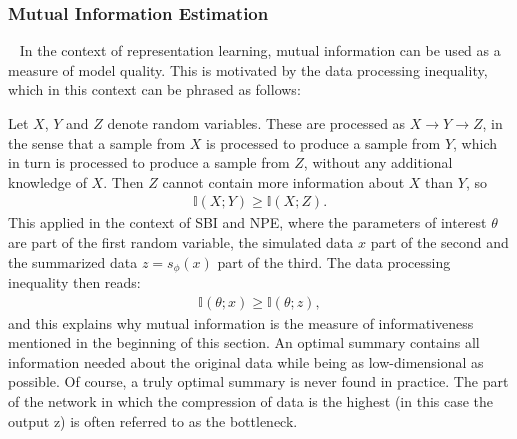 \subsubsection*{Mutual Information Estimation}~\label{subsubsec:mi_estimate}
In the context of representation learning, mutual information can be used as a measure of model quality. This is motivated by the data processing inequality, which in this context can be phrased as follows:

Let $X$, $Y$ and $Z$ denote random variables. These are processed as $X \rightarrow Y \rightarrow Z$, in the sense that a sample from $X$ is processed to produce a sample from $Y$, which in turn is processed to produce a sample from $Z$, without any additional knowledge of $X$. Then $Z$ cannot contain more information about $X$ than $Y$, so
\begin{align}
    \mathbb{I}(X;Y) \geq \mathbb{I}(X;Z).
\end{align}
This applied in the context of SBI and NPE, where the parameters of interest $\theta$ are part of the first random variable, the simulated data $x$ part of the second and the summarized data $z = s_\phi(x)$ part of the third. The data processing inequality then reads:
\begin{align}
    \mathbb{I}(\theta;x) 
    \geq \mathbb{I}(\theta;z),
\end{align}
and this explains why mutual information is the measure of informativeness mentioned in the beginning of this section. An optimal summary contains all information needed about the original data while being as low-dimensional as possible. Of course, a truly optimal summary is never found in practice. The part of the network in which the compression of data is the highest (in this case the output z) is often referred to as the bottleneck.

